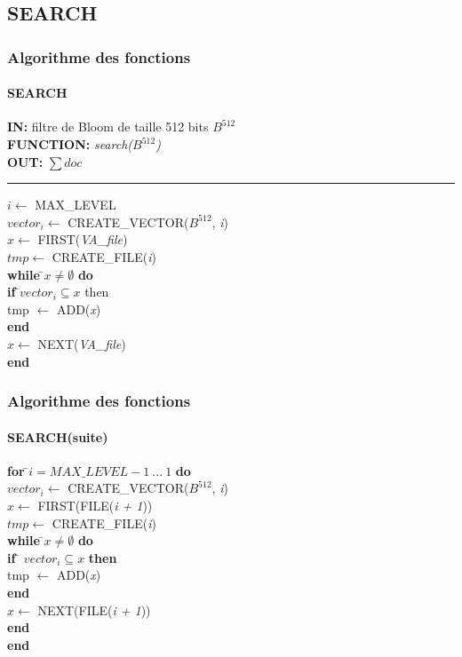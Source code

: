 \documentclass[hyperref={pdfpagemode=FullScreen,colorlinks=true},xcolor=pst,dvips]{beamer}\usepackage[french]{babel}
\begin{document}
	\subsection{SEARCH}
	\begin{frame}[shrink]
		\frametitle{Algorithme des fonctions}
		\framesubtitle{SEARCH}
		\begin{framed}
			\textbf{IN:} filtre de Bloom de taille 512 bits $B^{512}$\\
			\textbf{FUNCTION:} \textit{search($B^{512}$)}\\
			\textbf{OUT:} \textit{$\sum doc$}\\

			\noindent\rule{\linewidth}{0.5pt}

			\begin{tabbing}
				$i \leftarrow$ MAX\_LEVEL\\
				$vector_i \leftarrow$ CREATE\_VECTOR($B^{512}$, \textit{i})\\
				$x \leftarrow$ FIRST(\textit{VA\_file})\\
				$tmp \leftarrow$ CREATE\_FILE(\textit{i})\\
			
				\textbf{while }\=$x \neq \emptyset $ \textbf{do}\\
					\> \textbf{if }\=$vector_i \subseteq x$ {then}\\
					\>\> tmp $\leftarrow$ ADD(\textit{x})\\
					\> \textbf{end}\\
					\> $x \leftarrow$ NEXT(\textit{VA\_file})\\
				\textbf{end}\\
	    		\end{tabbing}		
		\end{framed}
	\end{frame}
	
	\begin{frame}[shrink]
		\frametitle{Algorithme des fonctions}
		\framesubtitle{SEARCH(suite)}
		\begin{framed}
			\begin{tabbing}
				\textbf{for }\=$i = MAX\_LEVEL - 1\ ...\ 1$ \textbf{do}\\
					\> $vector_i \leftarrow$ CREATE\_VECTOR($B^{512}$, \textit{i})\\
					\> $x \leftarrow$ FIRST(FILE(\textit{i + 1}))\\
					\> $tmp \leftarrow$ CREATE\_FILE(\textit{i})\\
					\> \textbf{while }\=$x \neq \emptyset$\textbf{ do}\\
					\> \> \textbf{if }\= $vector_i \subseteq x$\textbf{ then}\\
					\> \> \> tmp $\leftarrow$ ADD(\textit{x})\\
					\> \> \textbf{end}\\
					\> \> $x \leftarrow$ NEXT(FILE(\textit{i + 1}))\\
					\> \textbf{end}\\
				\textbf{end}	\\
			\end{tabbing}
		\end{framed}
	\end{frame}
	
\end{document}
